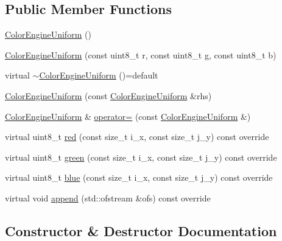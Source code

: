 \subsection*{Public Member Functions}
\begin{DoxyCompactItemize}
\item 
\hyperlink{classGraphicalEditorCore_1_1ColorEngineUniform_a9e76ad9019e3bb878f6250ca57e2f777}{Color\+Engine\+Uniform} ()
\item 
\hyperlink{classGraphicalEditorCore_1_1ColorEngineUniform_aa91a594076b06d41154b68543870b388}{Color\+Engine\+Uniform} (const uint8\+\_\+t r, const uint8\+\_\+t g, const uint8\+\_\+t b)
\item 
virtual \hyperlink{classGraphicalEditorCore_1_1ColorEngineUniform_a0bfdba9e4751b79bdcf9692ad57fde34}{$\sim$\+Color\+Engine\+Uniform} ()=default
\item 
\hyperlink{classGraphicalEditorCore_1_1ColorEngineUniform_a93f61f9e237172ff45434f9b783f3870}{Color\+Engine\+Uniform} (const \hyperlink{classGraphicalEditorCore_1_1ColorEngineUniform}{Color\+Engine\+Uniform} \&rhs)
\item 
\hyperlink{classGraphicalEditorCore_1_1ColorEngineUniform}{Color\+Engine\+Uniform} \& \hyperlink{classGraphicalEditorCore_1_1ColorEngineUniform_a423a6e179cca7d9c81f888b2b0f6cd2a}{operator=} (const \hyperlink{classGraphicalEditorCore_1_1ColorEngineUniform}{Color\+Engine\+Uniform} \&)
\item 
virtual uint8\+\_\+t \hyperlink{classGraphicalEditorCore_1_1ColorEngineUniform_a91461ce9955811e4e5e2f74cd2e9ec94}{red} (const size\+\_\+t i\+\_\+x, const size\+\_\+t j\+\_\+y) const override
\item 
virtual uint8\+\_\+t \hyperlink{classGraphicalEditorCore_1_1ColorEngineUniform_a219f34e3e5dabdf260e7c1adaa8bc2ee}{green} (const size\+\_\+t i\+\_\+x, const size\+\_\+t j\+\_\+y) const override
\item 
virtual uint8\+\_\+t \hyperlink{classGraphicalEditorCore_1_1ColorEngineUniform_ae5d9b3422740f667080f28d22a17830b}{blue} (const size\+\_\+t i\+\_\+x, const size\+\_\+t j\+\_\+y) const override
\item 
virtual void \hyperlink{classGraphicalEditorCore_1_1ColorEngineUniform_a844c6539bafb4881cdecb97bdef8ad2b}{append} (std\+::ofstream \&ofs) const override
\end{DoxyCompactItemize}


\subsection{Constructor \& Destructor Documentation}
